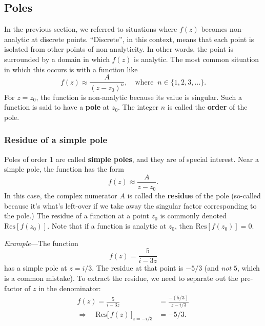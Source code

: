 \documentclass[10pt,a4paper]{article}
\begin{document}
\subsection{Poles}\label{poles}

In the previous section, we referred to situations where $f(z)$
becomes non-analytic at discrete points. ``Discrete'', in this context,
means that each point is isolated from other points of non-analyticity.
In other words, the point is surrounded by a domain in which $f(z)$ is
analytic. The most common situation in which this occurs is with a
function like
\begin{equation}
f(z) \approx \frac{A}{(z-z_0)^n}, \quad \mathrm{where}\;\; n\in\{1,2,3,\dots\}.
\end{equation}
For $z = z_0$, the function is non-analytic because its value is
singular. Such a function is said to have a \textbf{pole} at $z_0$.
The integer $n$ is called the \textbf{order} of the pole.

\subsubsection{Residue of a simple pole}\label{residue-of-a-simple-pole}

Poles of order 1 are called \textbf{simple poles}, and they are of
special interest. Near a simple pole, the function has the form
\begin{equation}
f(z) \approx \frac{A}{z-z_0}.
\end{equation}
In this case, the complex numerator $A$ is called the \textbf{residue}
of the pole (so-called because it's what's left-over if we take away the
singular factor corresponding to the pole.) The residue of a function at
a point $z_0$ is commonly denoted $\mathrm{Res}[f(z_0)]$. Note that
if a function is analytic at $z_0$, then $\mathrm{Res}[f(z_0)] = 0$.

\begin{framed} \noindent
  \textit{Example}---The function \[f(z) = \frac{5}{i-3z}\] has a
  simple pole at $z = i/3$.  The residue at that point is $-5/3$ (and
  \emph{not} $5$, which is a common mistake). To extract the residue,
  we need to separate out the pre-factor of $z$ in the denominator:
  \begin{align}f(z) = \frac{5}{i-3z} &= \frac{-(5/3)}{z - i/3} \\ \Rightarrow\quad \mathrm{Res}\big[\,f(z)\,\big]_{z = -i/3} &= - 5/3.
  \end{align}
\end{framed}
\end{document}
